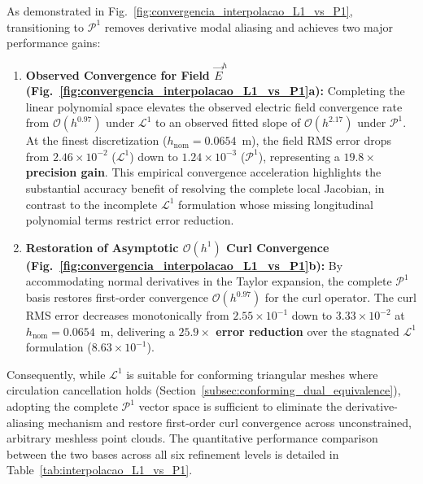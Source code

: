 \documentclass[preprint,12pt]{elsarticle}
\begin{document}
As demonstrated in Fig.~\ref{fig:convergencia_interpolacao_L1_vs_P1}, transitioning to $\mathcal{P}^1$ removes derivative modal aliasing and achieves two major performance gains:
\begin{enumerate}
    \item \textbf{Observed Convergence for Field $\vec{E}^h$ (Fig.~\ref{fig:convergencia_interpolacao_L1_vs_P1}a):} Completing the linear polynomial space elevates the observed electric field convergence rate from $\mathcal{O}(h^{0.97})$ under $\mathcal{L}^1$ to an observed fitted slope of $\mathcal{O}(h^{2.17})$ under $\mathcal{P}^1$. At the finest discretization ($h_{\mathrm{nom}} = 0.0654$~m), the field RMS error drops from $2.46 \times 10^{-2}$ ($\mathcal{L}^1$) down to $1.24 \times 10^{-3}$ ($\mathcal{P}^1$), representing a \textbf{$19.8\times$ precision gain}. This empirical convergence acceleration highlights the substantial accuracy benefit of resolving the complete local Jacobian, in contrast to the incomplete $\mathcal{L}^1$ formulation whose missing longitudinal polynomial terms restrict error reduction.
    \item \textbf{Restoration of Asymptotic $\mathcal{O}(h^1)$ Curl Convergence (Fig.~\ref{fig:convergencia_interpolacao_L1_vs_P1}b):} By accommodating normal derivatives in the Taylor expansion, the complete $\mathcal{P}^1$ basis restores first-order convergence $\mathcal{O}(h^{0.97})$ for the curl operator. The curl RMS error decreases monotonically from $2.55 \times 10^{-1}$ down to $3.33 \times 10^{-2}$ at $h_{\mathrm{nom}} = 0.0654$~m, delivering a \textbf{$25.9\times$ error reduction} over the stagnated $\mathcal{L}^1$ formulation ($8.63 \times 10^{-1}$).
\end{enumerate}

Consequently, while $\mathcal{L}^1$ is suitable for conforming triangular meshes where circulation cancellation holds (Section~\ref{subsec:conforming_dual_equivalence}), adopting the complete $\mathcal{P}^1$ vector space is sufficient to eliminate the derivative-aliasing mechanism and restore first-order curl convergence across unconstrained, arbitrary meshless point clouds. The quantitative performance comparison between the two bases across all six refinement levels is detailed in Table~\ref{tab:interpolacao_L1_vs_P1}.
\end{document}
